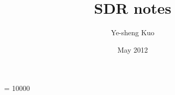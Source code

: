 \documentclass[10pt]{report}
\begin{document}
\widowpenalty = 10000

\title{SDR notes}

\author{Ye-sheng Kuo}
\date{May 2012}
\maketitle




\vfill\eject


\vfill\eject


{%
\raggedright


}
\end{document}
